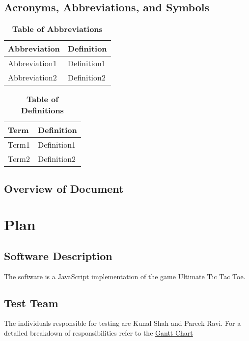 \documentclass[12pt, titlepage]{article}
\begin{document}
\subsection{Acronyms, Abbreviations, and Symbols}
	
\begin{table}[hbp]
\caption{\textbf{Table of Abbreviations}} \label{Table}

\begin{tabularx}{\textwidth}{p{3cm}X}
\toprule
\textbf{Abbreviation} & \textbf{Definition} \\
\midrule
Abbreviation1 & Definition1\\
Abbreviation2 & Definition2\\
\bottomrule
\end{tabularx}

\end{table}

\begin{table}[!htbp]
\caption{\textbf{Table of Definitions}} \label{Table}

\begin{tabularx}{\textwidth}{p{3cm}X}
\toprule
\textbf{Term} & \textbf{Definition}\\
\midrule
Term1 & Definition1\\
Term2 & Definition2\\
\bottomrule
\end{tabularx}

\end{table}	

\subsection{Overview of Document}

\section{Plan}
	
\subsection{Software Description}
The software is a JavaScript implementation of the game Ultimate Tic Tac Toe. 

\subsection{Test Team}
The individuals responsible for testing are Kunal Shah and Pareek Ravi. For a
detailed breakdown of responsibilities refer to the
\href{run:../../ProjectSchedule/Gantt Chart.gan}{Gantt Chart}
\end{document}
